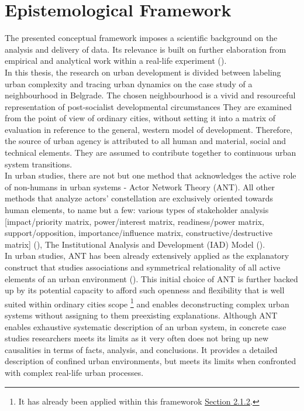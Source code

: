 \documentclass[11pt]{report}
\begin{document}
\section{Epistemological Framework}
The presented conceptual framework imposes a scientific background on the analysis and delivery of data.
Its relevance is built on further elaboration from empirical and analytical work within a real-life experiment (\cite{Parnell and Robinson}).
\\

In this thesis, the research on urban development is divided between labeling urban complexity and tracing urban dynamics on the case study of a neighbourhood in Belgrade.
The chosen neighbourhood is a vivid and resourceful representation of post-socialist developmental circumstances
They are examined from the point of view of ordinary cities, without setting it into a matrix of evaluation in reference to the general, western model of development.
Therefore, the source of urban agency is attributed to 
all human and material, social and technical elements. They are assumed to contribute together to continuous urban system transitions.
\\

In urban studies, there are not but one method that acknowledges the active role of non-humans in urban systems - Actor Network Theory (ANT).
All other methods that analyze actors' constellation are exclusively oriented towards human elements, to name but a few: various types of stakeholder analysis [impact/priority matrix, power/interest matrix, readiness/power matrix, support/opposition, importance/influence matrix,
constructive/destructive matrix] (\citealt{Mathur et al. 2007}), The Institutional Analysis and Development (IAD) Model (\citealt{Ostrom et al., 1994; Ostrom, 2007; from Getimis 2012}).
\\

In urban studies, ANT has been already extensively applied as the explanatory construct that studies associations and symmetrical relationality of all active elements of an urban environment (\href{Farias}{\citealt{Farías and Bender 2011}}).
This initial choice of ANT is further backed up by its
potential capacity to afford such openness and flexibility that is well suited within ordinary cities scope
\footnote{It has already been applied within this frameworok \href{Section 2.1.2}{Section 2.1.2}.} 
and enables deconstructing complex urban systems without assigning to them preexisting explanations.
Although ANT enables exhaustive systematic description of an urban system, in concrete case studies researchers meets its limits as it very often does not bring up new causalities in terms of facts, analysis, and conclusions.
It provides a detailed description of confined urban environments, but meets its limits when confronted with complex real-life urban processes.
\\
\end{document}
